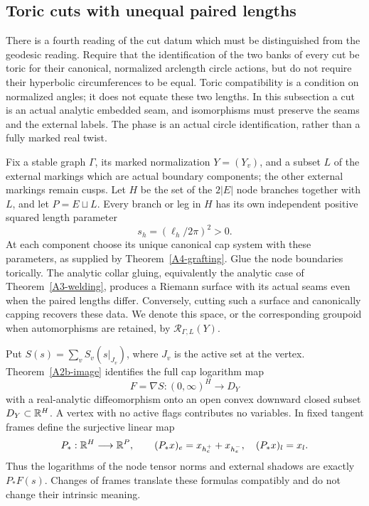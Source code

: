 \subsection{Toric cuts with unequal paired lengths}
\label{sec:A1-toric-unequal}

There is a fourth reading of the cut datum which must be distinguished
from the geodesic reading. Require that the identification of the two
banks of every cut be toric for their canonical, normalized arclength
circle actions, but do not require their hyperbolic circumferences to
be equal. Toric compatibility is a condition on normalized angles;
it does not equate these two lengths. In this subsection a cut is
an actual analytic embedded seam, and isomorphisms must preserve the
seams and the external labels. The phase is an actual circle
identification, rather than a fully marked real twist.

Fix a stable graph $\Gamma$, its marked normalization $Y=(Y_v)$,
and a subset $L$ of the external markings which are actual boundary
components; the other external markings remain cusps. Let $H$ be
the set of the $2|E|$ node branches together with $L$, and let
$P=E\sqcup L$. Every branch or leg in $H$ has its own independent
positive squared length parameter
\[
 s_h=(\ell_h/2\pi)^2>0.
\]
At each component choose its unique canonical cap system with these
parameters, as supplied by Theorem~\ref{A4-grafting}. Glue the node
boundaries torically. The analytic collar gluing, equivalently the
analytic case of Theorem~\ref{A3-welding}, produces a Riemann surface
with its actual seams even when the paired lengths differ. Conversely,
cutting such a surface and canonically capping recovers these data.
We denote this space, or the corresponding groupoid when
automorphisms are retained, by $\mathcal R_{\Gamma,L}(Y)$.

Put $S(s)=\sum_v S_v(s|_{J_v})$, where $J_v$ is the active set at
the vertex. Theorem~\ref{A2b-image} identifies the full cap logarithm
map
\[
 F=\nabla S:(0,\infty)^H\longrightarrow D_Y
\]
with a real-analytic diffeomorphism onto an open convex downward
closed subset $D_Y\subset{\ensuremath{\mathbb{R}}}^H$. A vertex with no active flags
contributes no variables. In fixed tangent frames define the
surjective linear map
\[
 P_*:{\mathbb{R}}^H\longrightarrow{\ensuremath{\mathbb{R}}}^P,\qquad
 (P_*x)_e=x_{h_e^+}+x_{h_e^-},\quad
 (P_*x)_l=x_l.
\]
Thus the logarithms of the node tensor norms and external shadows
are exactly $P_*F(s)$. Changes of frames translate these formulas
compatibly and do not change their intrinsic meaning.

